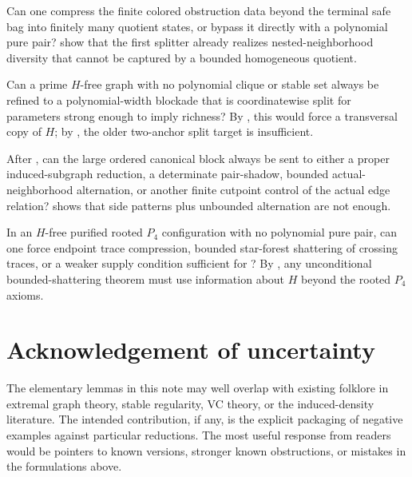 \begin{question}
Can one compress the finite colored obstruction data beyond the terminal safe bag into finitely many quotient states, or bypass it directly with a polynomial pure pair?  show that the first splitter already realizes nested-neighborhood diversity that cannot be captured by a bounded homogeneous quotient.
\end{question}

\begin{question}
Can a prime $H$-free graph with no polynomial clique or stable set always be refined to a polynomial-width blockade that is coordinatewise split for parameters strong enough to imply richness? By , this would force a transversal copy of $H$; by , the older two-anchor split target is insufficient.
\end{question}

\begin{question}
After , can the large ordered canonical block always be sent to either a proper induced-subgraph reduction, a determinate pair-shadow, bounded actual-neighborhood alternation, or another finite cutpoint control of the actual edge relation?  shows that side patterns plus unbounded alternation are not enough.
\end{question}

\begin{question}
In an $H$-free purified rooted $P_4$ configuration with no polynomial pure pair, can one force endpoint trace compression, bounded star-forest shattering of crossing traces, or a weaker supply condition sufficient for ? By , any unconditional bounded-shattering theorem must use information about $H$ beyond the rooted $P_4$ axioms.
\end{question}

\section*{Acknowledgement of uncertainty}
The elementary lemmas in this note may well overlap with existing folklore in extremal graph theory, stable regularity, VC theory, or the induced-density literature. The intended contribution, if any, is the explicit packaging of negative examples against particular reductions. The most useful response from readers would be pointers to known versions, stronger known obstructions, or mistakes in the formulations above.

\printbibliography


